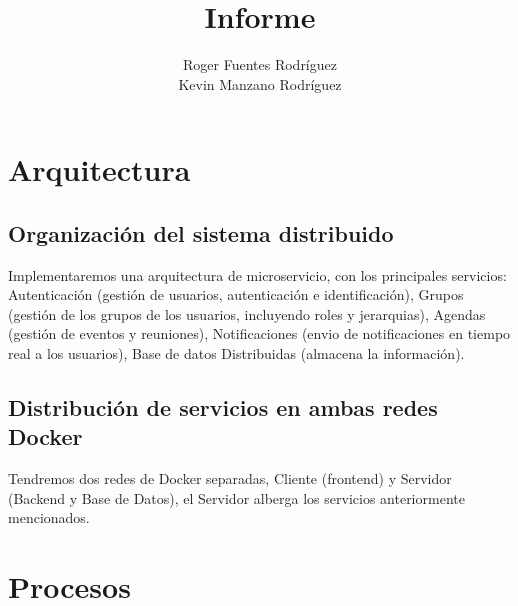 \documentclass[11pt,a4paper]{article}
\title{Informe}
\author{Roger Fuentes Rodr\'iguez \\
        Kevin Manzano Rodr\'iguez}
\date{}
\begin{document}
\maketitle

\tableofcontents

\section{Arquitectura} 

\subsection{Organizaci\'on del sistema distribuido}

Implementaremos una arquitectura de microservicio, con los principales servicios: Autenticaci\'on (gesti\'on de usuarios, autenticaci\'on e identificaci\'on), Grupos (gesti\'on de los grupos de los usuarios, incluyendo roles y jerarquias), Agendas (gesti\'on de eventos y reuniones), Notificaciones (envio de notificaciones en tiempo real a los usuarios), Base de datos Distribuidas (almacena la informaci\'on).

\subsection{Distribuci\'on de servicios en ambas redes Docker}

Tendremos dos redes de Docker separadas, Cliente (frontend) y Servidor (Backend y Base de Datos), el Servidor alberga los servicios anteriormente mencionados.

\section{Procesos} 
\end{document}
